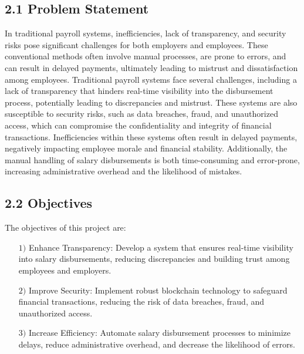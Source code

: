 \documentclass[12pt]{report}
\begin{document}
\subsection*{2.1 Problem Statement}
\begin{center}    
    \justify
 In traditional payroll systems, inefficiencies, lack of transparency, and security risks pose significant challenges for both employers and employees. These conventional methods often involve manual processes, are prone to errors, and can result in delayed payments, ultimately leading to mistrust and dissatisfaction among employees.
Traditional payroll systems face several challenges, including a lack of transparency that hinders real-time visibility into the disbursement process, potentially leading to discrepancies and mistrust. These systems are also susceptible to security risks, such as data breaches, fraud, and unauthorized access, which can compromise the confidentiality and integrity of financial transactions. Inefficiencies within these systems often result in delayed payments, negatively impacting employee morale and financial stability. Additionally, the manual handling of salary disbursements is both time-consuming and error-prone, increasing administrative overhead and the likelihood of mistakes.
\end{center}
\vspace{0.7em}
\subsection*{2.2 Objectives}
\begin{center}    
    \justify
The objectives of this project are:
\begin{itemize}
    \item[$1)$] Enhance Transparency: Develop a system that ensures real-time visibility into salary disbursements, reducing discrepancies and building trust among employees and employers.
    \item[$2)$] Improve Security: Implement robust blockchain technology to safeguard financial transactions, reducing the risk of data breaches, fraud, and unauthorized access.
    \item[$3)$] Increase Efficiency: Automate salary disbursement processes to minimize delays, reduce administrative overhead, and decrease the likelihood of errors.
\end{itemize}
\end{center}
\vspace{0.7em}
\end{document}
